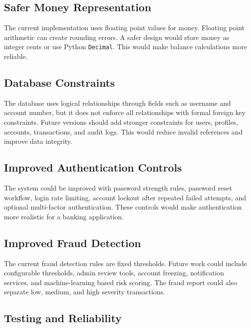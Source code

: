 \documentclass[12pt,a4paper]{article}
\newcommand{\subsectionbreakguard}{\Needspace{5\baselineskip}}
\begin{document}
\subsectionbreakguard
\subsection{Safer Money Representation}

The current implementation uses floating point values for money. Floating point arithmetic can create rounding errors. A safer design would store money as integer cents or use Python \texttt{Decimal}. This would make balance calculations more reliable.

\subsectionbreakguard
\subsection{Database Constraints}

The database uses logical relationships through fields such as username and account number, but it does not enforce all relationships with formal foreign key constraints. Future versions should add stronger constraints for users, profiles, accounts, transactions, and audit logs. This would reduce invalid references and improve data integrity.

\subsectionbreakguard
\subsection{Improved Authentication Controls}

The system could be improved with password strength rules, password reset workflow, login rate limiting, account lockout after repeated failed attempts, and optional multi-factor authentication. These controls would make authentication more realistic for a banking application.

\subsectionbreakguard
\subsection{Improved Fraud Detection}

The current fraud detection rules are fixed thresholds. Future work could include configurable thresholds, admin review tools, account freezing, notification services, and machine-learning based risk scoring. The fraud report could also separate low, medium, and high severity transactions.

\subsectionbreakguard
\subsection{Testing and Reliability}
\end{document}
